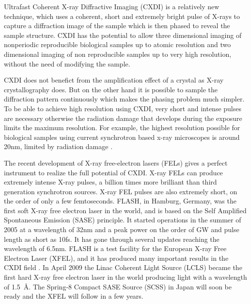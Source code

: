 
Ultrafast Coherent X-ray Diffractive Imaging (CXDI) is a relatively new
technique, which uses a coherent, short and extremely
bright pulse of X-rays to capture a diffraction image of the sample which is
then phased to reveal the sample structure. CXDI has the potential to allow three
dimensional imaging of nonperiodic reproducible biological samples up to atomic
resolution and two dimensional imaging of non reproducible samples up to
very high resolution, without the need of modifying the sample.

CXDI does not benefict from the
amplification effect of a crystal as X-ray crystallography does. But on the
other hand it is possible to sample the diffraction pattern continuously which
makes the phasing problem much simpler. To be able to achieve high 
resolution using CXDI, very short and intense pulses are necessary otherwise the radiation
damage that develops during the exposure limits the maximum resolution. For
example, the highest resolution possible for biological samples using current
synchrotron based x-ray microscopes is around 20nm, limited by radiation
damage \cite{Howells2009Assessment}.

The recent development of X-ray free-electron lasers (FELs) gives a perfect
instrument to realize the full potential of CXDI. X-ray FELs can produce extremely
intense X-ray pulses, a billion times more brilliant than third
generation synchrotron sources. X-ray FEL pulses are also extremely short, on the order of
only a few femtoseconds. FLASH, in Hamburg, Germany, was the first soft X-ray
free electron laser in the world, and is based on the Self Amplified Spontaneous
Emission (SASE) principle. It started operations in the summer of 2005 at
a wavelength of 32nm and a peak power on the order of GW and pulse length as
short as 10fs. It has gone through several updates reaching the wavelength of
6.5nm. FLASH is a test facility for the European X-ray Free Electron
Laser (XFEL), and it has produced many important results in the CXDI field \cite{Chapman2006Femtosecond,Chapman2007Femtosecond}. In April 2009 the Linac Coherent Light Source (LCLS)
became the first hard X-ray free electron laser in the world producing light
with a wavelength of \mbox{1.5 \AA}. The Spring-8 Compact SASE Source (SCSS) in
Japan will soon be ready and the XFEL will follow in a few years.

